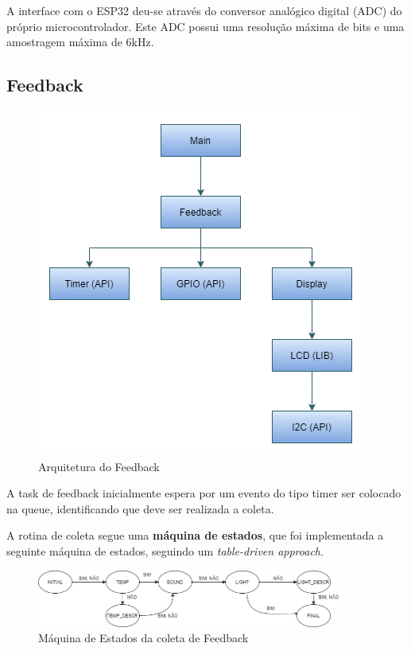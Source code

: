 \documentclass[../monografia.tex]{subfiles}
\begin{document}
A interface com o ESP32 deu-se através do conversor analógico digital (ADC) do próprio microcontrolador. Este ADC possui uma resolução máxima de 
bits e uma amostragem máxima de 6kHz. 

\subsection{Feedback}

\begin{figure}[h]
	\centering
	\includegraphics[scale=0.8]{feedback-arch}
	\caption{Arquitetura do Feedback}
	\label{fig:feedback-arch}
\end{figure}

A task de feedback inicialmente espera por um evento do tipo timer ser colocado na queue, identificando que deve ser realizada a coleta.

A rotina de coleta segue uma \textbf{máquina de estados}, que foi implementada a seguinte máquina de estados, seguindo um \textit{table-driven approach}.

\begin{figure}[h]
	\centering
	\includegraphics[width=0.9\textwidth]{fsm-feedback.png}
	\caption{Máquina de Estados da coleta de Feedback}
	\label{fig:fsm-feedback}
\end{figure}
\end{document}
